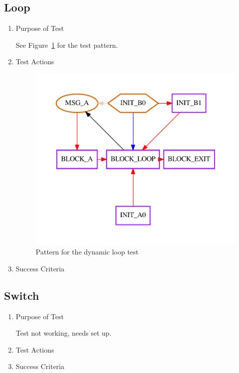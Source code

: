 \documentclass[12pt,a4paper]{report}
\begin{document}
\subsection{Loop}
\begin{enumerate}
	\item Purpose of Test

	See Figure~\ref{fig:Pattern_for_the_dynamic_loop_test} for the test pattern.
	\item Test Actions
    \begin{figure}
        \centering 
        \includegraphics{TestPattern/dynamic_loop.pdf}
        \caption{Pattern for the dynamic loop test}
        \label{fig:Pattern_for_the_dynamic_loop_test}
    \end{figure}
	\item Success Criteria
\end{enumerate}
\subsection{Switch}
\begin{enumerate}
	\item Purpose of Test

	Test not working, needs set up.
	\item Test Actions
	\item Success Criteria
\end{enumerate}
\end{document}
